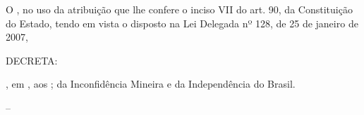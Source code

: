 \documentclass[a4paper,11pt]{report}
\begin{document}


O \CargoSignatario, no uso da atribuição que lhe confere o inciso VII do art. 90, da Constituição do Estado, tendo em vista o disposto na Lei Delegada nº 128, de 25 de janeiro de 2007,

DECRETA:























\LocalAssinatura, em \CidadeAssinatura, aos \DataAssinatura; \AnivInconfidencia da Inconfidência Mineira e \AnivIndependencia da Independência do Brasil.

\Signatario – \CargoSignatario

\end{document}
